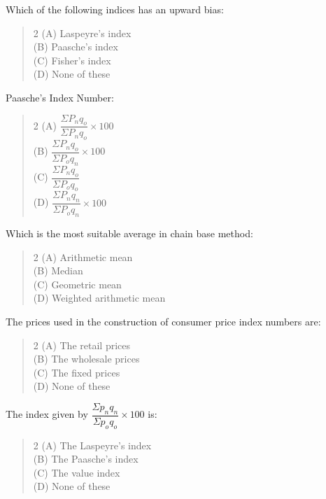 \documentclass[11pt,a4paper]{article}
\begin{document}
\begin{mcqlist}
\item Which of the following indices has an upward bias:
\begin{quote}\begin{multicols}{2}
\noindent (A) Laspeyre's index \\
(B) Paasche's index \\
(C) Fisher's index \\
(D) None of these
\end{multicols}\end{quote}

\item Paasche's Index Number:
\begin{quote}\begin{multicols}{2}
\noindent (A) $\dfrac{\Sigma P_nq_o}{\Sigma P_nq_o}\times 100$ \\
(B) $\dfrac{\Sigma P_nq_o}{\Sigma P_oq_n}\times 100$ \\
(C) $\dfrac{\Sigma P_nq_o}{\Sigma P_oq_o}$ \\
(D) $\dfrac{\Sigma P_nq_n}{\Sigma P_oq_n}\times 100$
\end{multicols}\end{quote}

\item Which is the most suitable average in chain base method:
\begin{quote}\begin{multicols}{2}
\noindent (A) Arithmetic mean \\
(B) Median \\
(C) Geometric mean \\
(D) Weighted arithmetic mean
\end{multicols}\end{quote}

\item The prices used in the construction of consumer price index numbers are:
\begin{quote}\begin{multicols}{2}
\noindent (A) The retail prices \\
(B) The wholesale prices \\
(C) The fixed prices \\
(D) None of these
\end{multicols}\end{quote}

\item The index given by $\dfrac{\Sigma p_nq_n}{\Sigma p_oq_o}\times 100$ is:
\begin{quote}\begin{multicols}{2}
\noindent (A) The Laspeyre's index \\
(B) The Paasche's index \\
(C) The value index \\
(D) None of these
\end{multicols}\end{quote}


\end{mcqlist}
\end{document}
